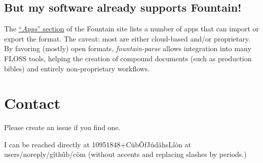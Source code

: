 \documentclass[12pt]{article}
\newcommand{\link}[2]{\underline{\color{darkblue}\href{#1}{#2}}}
\begin{document}
\subsection*{But my software already supports Fountain!}
The \link{https://fountain.io/apps/}{``\emph{Apps}''
section} of the Fountain site lists a number of apps that can
import or export the format. The caveat: most are either
cloud-based and/or proprietary. By favoring (mostly) open formats,
\emph{fountain-parse} allows integration into many FLOSS tools,
helping the creation of compound documents (such as production
bibles) and entirely non-proprietary workflows.

\section*{Contact}
Please create an issue if you find one.

I can be reached directly at
\textsf{10951848+C\"{u}b\^{O}fJ\'{u}d\~{a}hsL\^{i}\`{o}n}
at \textsf{users/noreply/g\^{i}th\~{u}b/c\"{o}m} (without accents and
replacing slashes by periods.)
\end{document}
